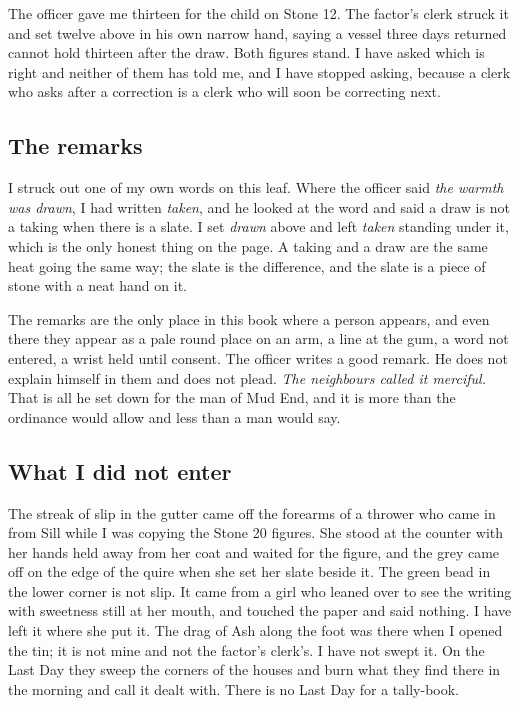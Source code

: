 \documentclass{design/chronicle}
\begin{document}
The officer gave me thirteen for the child on Stone 12. The factor’s clerk struck it and set twelve above in his own narrow hand, saying a vessel three days returned cannot hold thirteen after the draw. Both figures stand. I have asked which is right and neither of them has told me, and I have stopped asking, because a clerk who asks after a correction is a clerk who will soon be correcting next.

\subsection*{The remarks}

I struck out one of my own words on this leaf. Where the officer said \emph{the warmth was drawn}, I had written \emph{taken}, and he looked at the word and said a draw is not a taking when there is a slate. I set \emph{drawn} above and left \emph{taken} standing under it, which is the only honest thing on the page. A taking and a draw are the same heat going the same way; the slate is the difference, and the slate is a piece of stone with a neat hand on it.

The remarks are the only place in this book where a person appears, and even there they appear as a pale round place on an arm, a line at the gum, a word not entered, a wrist held until consent. The officer writes a good remark. He does not explain himself in them and does not plead. \emph{The neighbours called it merciful.} That is all he set down for the man of Mud End, and it is more than the ordinance would allow and less than a man would say.

\subsection*{What I did not enter}

The streak of slip in the gutter came off the forearms of a thrower who came in from Sill while I was copying the Stone 20 figures. She stood at the counter with her hands held away from her coat and waited for the figure, and the grey came off on the edge of the quire when she set her slate beside it. The green bead in the lower corner is not slip. It came from a girl who leaned over to see the writing with sweetness still at her mouth, and touched the paper and said nothing. I have left it where she put it. The drag of Ash along the foot was there when I opened the tin; it is not mine and not the factor’s clerk’s. I have not swept it. On the Last Day they sweep the corners of the houses and burn what they find there in the morning and call it dealt with. There is no Last Day for a tally-book.
\end{document}
